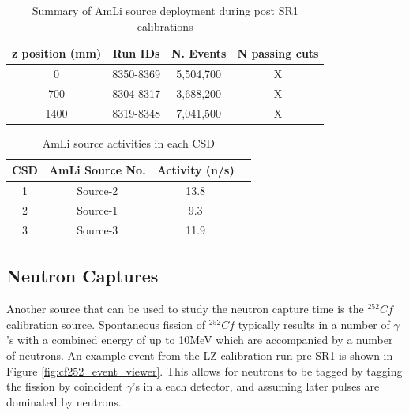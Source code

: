 \begin{table}[!htbp]
    \centering
    \begin{tabular}{c|c|c|c}
        z position (mm)   & Run IDs   & N. Events & N passing cuts \\ \hline
        0                 & 8350-8369 & 5,504,700 & X               \\
        700               & 8304-8317 & 3,688,200 & X               \\ 
        1400              & 8319-8348 & 7,041,500 & X                
    \end{tabular}
    \caption{Summary of AmLi source deployment during post SR1 calibrations}
    \label{tab:amli_calibration_summary}
\end{table}

\begin{table}[!htbp]
    \centering
    \begin{tabular}{c|c|c|c}
        CSD & AmLi Source No. & Activity (n/s) \\ \hline
        1   & Source-2        & 13.8           \\
        2   & Source-1        & 9.3            \\ 
        3   & Source-3        & 11.9                
    \end{tabular}
    \caption{AmLi source activities in each CSD}
    \label{tab:amli_source_activities}
\end{table}


\subsection{Neutron Captures}
\par
Another source that can be used to study the neutron capture time is the ${}^{252}{Cf}$ calibration source.
Spontaneous fission of ${}^{252}{Cf}$ typically results in a number of $\gamma$'s with a combined energy of up to 10MeV which are accompanied by a number of neutrons.
An example event from the LZ calibration run pre-SR1 is shown in Figure \ref{fig:cf252_event_viewer}.
This allows for neutrons to be tagged by tagging the fission by coincident $\gamma$'s in a each detector, and assuming later pulses are dominated by neutrons.

